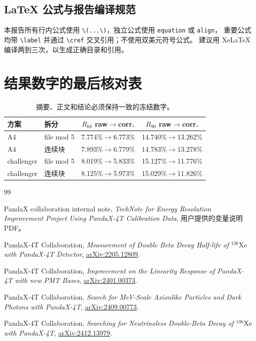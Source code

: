 \documentclass[UTF8,12pt,a4paper,oneside,fontset=none]{ctexart}
\numberwithin{equation}{section}
\newcommand{\Rsixtyeight}{R_{68}}
\newcommand{\Rninety}{R_{90}}
\begin{document}
\subsection{LaTeX 公式与报告编译规范}

本报告所有行内公式使用 \verb|\(...\)|，独立公式使用 \texttt{equation} 或 \texttt{align}，
重要公式均带 \verb|\label| 并通过 \verb|\cref| 交叉引用；不使用双美元符号公式。
建议用 XeLaTeX 编译两到三次，以生成正确目录和引用。

\clearpage
\section{结果数字的最后核对表}

\begin{table}[H]
\centering
\caption{摘要、正文和结论必须保持一致的冻结数字。}
\label{tab:frozen-numbers}
\begin{tabular}{llcc}
\toprule
方案 & 拆分 & \(\Rsixtyeight\) raw\(\rightarrow\)corr. & \(\Rninety\) raw\(\rightarrow\)corr. \\
\midrule
A4 & file mod 5 & 7.774\%\(\rightarrow\)6.773\% & 14.740\%\(\rightarrow\)13.262\% \\
A4 & 连续块 & 7.893\%\(\rightarrow\)6.779\% & 14.783\%\(\rightarrow\)13.278\% \\
challenger & file mod 5 & 8.019\%\(\rightarrow\)5.833\% & 15.127\%\(\rightarrow\)11.776\% \\
challenger & 连续块 & 8.125\%\(\rightarrow\)5.973\% & 15.029\%\(\rightarrow\)11.826\% \\
\bottomrule
\end{tabular}
\end{table}

\clearpage
\begin{thebibliography}{99}

PandaX collaboration internal note,
\emph{TechNote for Energy Resolution Improvement Project Using PandaX-4T Calibration Data},
用户提供的变量说明 PDF。

PandaX-4T Collaboration,
\emph{Measurement of Double Beta Decay Half-life of \(^{136}\mathrm{Xe}\) with PandaX-4T Detector},
\href{https://arxiv.org/abs/2205.12809}{arXiv:2205.12809}.

PandaX-4T Collaboration,
\emph{Improvement on the Linearity Response of PandaX-4T with new PMT Bases},
\href{https://arxiv.org/abs/2401.00373}{arXiv:2401.00373}.

PandaX-4T Collaboration,
\emph{Search for MeV-Scale Axionlike Particles and Dark Photons with PandaX-4T},
\href{https://arxiv.org/abs/2409.00773}{arXiv:2409.00773}.

PandaX-4T Collaboration,
\emph{Searching for Neutrinoless Double-Beta Decay of \(^{136}\mathrm{Xe}\) with PandaX-4T},
\href{https://arxiv.org/abs/2412.13979}{arXiv:2412.13979}.

\end{thebibliography}
\end{document}
